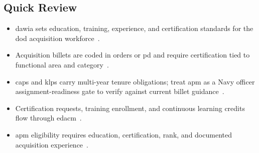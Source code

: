 \documentclass[../main.tex]{subfiles}
\begin{document}
\subsection{Quick Review}
\begin{itemize}
  \item \ac{dawia} sets education, training, experience, and certification standards for the \ac{dod} acquisition workforce~\autocite{edo-5-2-1-dawia-2025,DoDI-5000-66-DAWIA-2022}.
  \item Acquisition billets are coded in orders or \ac{pd} and require certification tied to functional area and category~\autocite{edo-5-2-1-dawia-2025,DoDI-5000-66-DAWIA-2022}.
  \item \acp{cap} and \acp{klp} carry multi-year tenure obligations; treat \ac{apm} as a Navy officer assignment-readiness gate to verify against current billet guidance~\autocite{edo-5-2-1-dawia-2025,DoDI-5000-66-DAWIA-2022}.
  \item Certification requests, training enrollment, and continuous learning credits flow through \ac{edacm}~\autocite{edo-5-2-1-dawia-2025}.
  \item \ac{apm} eligibility requires education, certification, rank, and documented acquisition experience~\autocite{edo-5-2-1-dawia-2025}.
\end{itemize}

\end{document}
